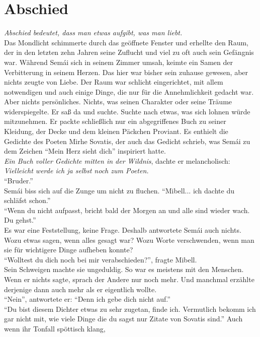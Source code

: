 \chapter{Abschied}


\textit{Abschied bedeutet, dass man etwas aufgibt, was man liebt.}\\
Das Mondlicht schimmerte durch das geöffnete Fenster und erhellte den Raum, der in den letzten zehn 
Jahren seine Zuflucht und viel zu oft auch sein Gefängnis war. Während Semái sich in seinem Zimmer 
umsah, keimte ein Samen der Verbitterung in seinem Herzen. Das hier war bisher sein zuhause 
gewesen, aber nichts zeugte von Liebe. Der Raum war schlicht eingerichtet, mit allem notwendigen 
und auch einige Dinge, die nur für die Annehmlichkeit gedacht war. Aber nichts persönliches. 
Nichts, was seinen Charakter oder seine Träume widerspiegelte. Er saß da und suchte. Suchte nach 
etwas, was sich lohnen würde mitzunehmen. Er packte schließlich nur ein abgegriffenes Buch zu 
seiner Kleidung, der Decke und dem kleinen Päckchen Proviant. Es enthielt die Gedichte des Poeten 
Mirhe Sovatis, der auch das Gedicht schrieb, was Semái zu dem Zeichen ``Mein Herz sieht dich'' 
inspiriert hatte. \\
\textit{Ein Buch voller Gedichte mitten in der Wildnis}, dachte er melancholisch: 
\textit{Vielleicht werde ich ja selbst noch zum Poeten.}\\
``Bruder.''\\
Semái biss sich auf die Zunge um nicht zu fluchen. ``Mibell... ich dachte du schläfst schon.''\\
``Wenn du nicht aufpasst, bricht bald der Morgen an und alle sind wieder wach. Du gehst.''\\
Es war eine Feststellung, keine Frage. Deshalb antwortete Semái auch nichts. Wozu etwas sagen, wenn 
alles gesagt war? Wozu Worte verschwenden, wenn man sie für wichtigere Dinge aufheben konnte?\\
``Wolltest du dich noch bei mir verabschieden?'', fragte Mibell. \\
Sein Schweigen machte sie ungeduldig. So war es meistens mit den Menschen. Wenn er nichts sagte, 
sprach der Andere nur noch mehr. Und manchmal erzählte derjenige dann auch mehr als er eigentlich 
wollte. \\
``Nein'', antwortete er: ``Denn ich gebe dich nicht auf.''\\
``Du bist diesem Dichter etwas zu sehr zugetan, finde ich. Vermutlich bekomm ich gar nicht mit, wie 
viele Dinge die du sagst nur Zitate von Sovatis sind.'' Auch wenn ihr Tonfall spöttisch klang, 
